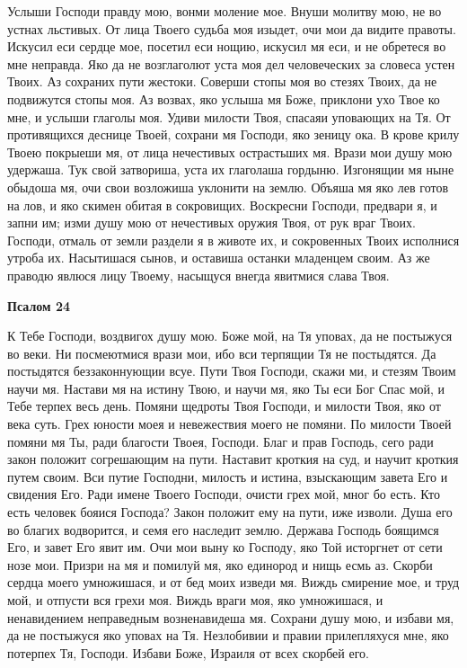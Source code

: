 Услыши Господи правду мою, вонми моление мое. Внуши молитву мою, не во устнах льстивых. От лица Твоего судьба моя изыдет, очи мои да видите правоты. Искусил еси сердце мое, посетил еси нощию, искусил мя еси, и не обретеся во мне неправда. Яко да не возглаголют уста моя дел человеческих за словеса устен Твоих. Аз сохраних пути жестоки. Соверши стопы моя во стезях Твоих, да не подвижутся стопы моя. Аз возвах, яко услыша мя Боже, приклони ухо Твое ко мне, и услыши глаголы моя. Удиви милости Твоя, спасаяи уповающих на Тя. От противящихся деснице Твоей, сохрани мя Господи, яко зеницу ока. В крове крилу Твоею покрыеши мя, от лица нечестивых острастьших мя. Врази мои душу мою удержаша. Тук свой затвориша, уста их глаголаша гордыню. Изгонящии мя ныне обыдоша мя, очи свои возложиша уклонити на землю. Объяша мя яко лев готов на лов, и яко скимен обитая в сокровищих. Воскресни Господи, предвари я, и запни им; изми душу мою от нечестивых оружия Твоя, от рук враг Твоих. Господи, отмаль от земли раздели я в животе их, и сокровенных Твоих исполнися утроба их. Насытишася сынов, и оставиша останки младенцем своим. Аз же праводю явлюся лицу Твоему, насыщуся внегда явитмися слава Твоя.





\bfseries Псалом 24\normalfont{}


К Тебе Господи, воздвигох душу мою. Боже мой, на Тя уповах, да не постыжуся во веки. Ни посмеютмися врази мои, ибо вси терпящии Тя не постыдятся. Да постыдятся беззаконнующии всуе. Пути Твоя Господи, скажи ми, и стезям Твоим научи мя. Настави мя на истину Твою, и научи мя, яко Ты еси Бог Спас мой, и Тебе терпех весь день. Помяни щедроты Твоя Господи, и милости Твоя, яко от века суть. Грех юности моея и невежествия моего не помяни. По милости Твоей помяни мя Ты, ради благости Твоея, Господи. Благ и прав Господь, сего ради закон положит согрешающим на пути. Наставит кроткия на суд, и научит кроткия путем своим. Вси путие Господни, милость и истина, взыскающим завета Его и свидения Его. Ради имене Твоего Господи, очисти грех мой, мног бо есть. Кто есть человек бояися Господа? Закон положит ему на пути, иже изволи. Душа его во благих водворится, и семя его наследит землю. Держава Господь боящимся Его, и завет Его явит им. Очи мои выну ко Господу, яко Той исторгнет от сети нозе мои. Призри на мя и помилуй мя, яко единород и нищь есмь аз. Скорби сердца моего умножишася, и от бед моих изведи мя. Виждь смирение мое, и труд мой, и отпусти вся грехи моя. Виждь враги моя, яко умножишася, и ненавидением неправедным возненавидеша мя. Сохрани душу мою, и избави мя, да не постыжуся яко уповах на Тя. Незлобивии и правии прилепляхуся мне, яко потерпех Тя, Господи. Избави Боже, Израиля от всех скорбей его.





